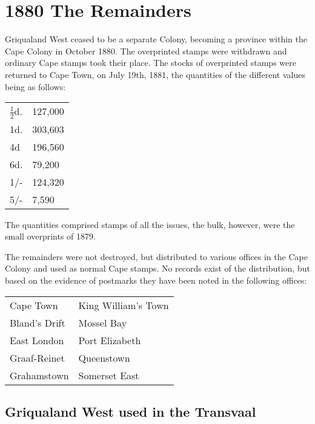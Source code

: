 \chapter{1880 The Remainders} 

Griqualand West ceased to be a separate Colony, becoming a province within the Cape Colony in October 1880. The overprinted stamps were withdrawn and ordinary Cape stamps
took their place. The stocks of overprinted stamps were returned to Cape Town, on July 19th, 1881, the quantities of the different values being as follows:

\begin{tabular}{ll}
\toprule$\frac{1}{2}$d.  &127,000 \\
 1d.    &303,603 \\
 4d     &196,560 \\
 6d.    &79,200  \\
 1/-    &124,320 \\
 5/-    &7,590  
\end{tabular}

The quantities comprised stamps of all the issues, the bulk, however, were the small overprints of 1879.

The remainders were not destroyed, but distributed to various offices in the Cape Colony and used as normal Cape stamps. No records exist of the distribution, but based on the evidence of postmarks they have been noted in the following offices:

\begin{tabular}{ll}
 Cape Town & King William's Town\\
 Bland's Drift & Mossel Bay\\
 East London & Port Elizabeth\\
 Graaf-Reinet & Queenstown\\
 Grahamstown  &Somerset East
\end{tabular}

\section{Griqualand West used in the Transvaal}


